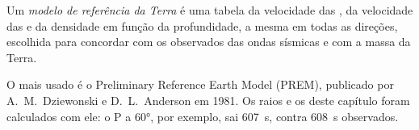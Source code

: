 \begin{definition}\label{def:g11:seismic-structure:reference-model}
Um \emph{modelo de referência da Terra} é uma tabela da
velocidade das , da velocidade das  e da densidade em função
da profundidade, a mesma em todas as direções, escolhida para concordar com
os  observados das ondas sísmicas e com a massa da Terra.
\end{definition}

O mais usado é o Preliminary Reference Earth Model (PREM), publicado por
A.~M.~Dziewonski e D.~L.~Anderson em 1981. Os raios e os 
deste capítulo foram calculados com ele: o  P a \ang{60},
por exemplo, sai \qty{607}{s}, contra \qty{608}{s} observados.

